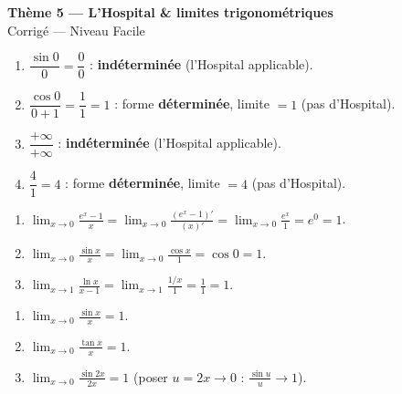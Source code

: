 \documentclass[11pt,a4paper]{article}
\begin{document}
\begin{center}
{\Large\bfseries\color{primarydark}Thème 5 — L'Hospital \& limites trigonométriques}\\[2pt]
{\large\color{excol}Corrigé — Niveau Facile}
\end{center}
\vspace{6pt}

\begin{correction}
\begin{enumerate}[label=\alph*),leftmargin=2em,itemsep=3pt]
  \item $\dfrac{\sin 0}{0}=\dfrac00$ : \textbf{indéterminée} (l'Hospital applicable).
  \item $\dfrac{\cos 0}{0+1}=\dfrac{1}{1}=1$ : forme \textbf{déterminée}, limite $=1$ (pas d'Hospital).
  \item $\dfrac{+\infty}{+\infty}$ : \textbf{indéterminée} (l'Hospital applicable).
  \item $\dfrac{4}{1}=4$ : forme \textbf{déterminée}, limite $=4$ (pas d'Hospital).
\end{enumerate}
\end{correction}

\begin{correction}
\begin{enumerate}[label=\alph*),leftmargin=2em,itemsep=3pt]
  \item $\displaystyle\lim_{x\to 0}\frac{e^x-1}{x}=\lim_{x\to 0}\frac{(e^x-1)'}{(x)'}=\lim_{x\to0}\frac{e^x}{1}=e^0=1$.
  \item $\displaystyle\lim_{x\to 0}\frac{\sin x}{x}=\lim_{x\to 0}\frac{\cos x}{1}=\cos 0=1$.
  \item $\displaystyle\lim_{x\to 1}\frac{\ln x}{x-1}=\lim_{x\to 1}\frac{1/x}{1}=\frac{1}{1}=1$.
\end{enumerate}
\end{correction}

\begin{correction}
\begin{enumerate}[label=\alph*),leftmargin=2em,itemsep=3pt]
  \item $\displaystyle\lim_{x\to 0}\frac{\sin x}{x}=1$.
  \item $\displaystyle\lim_{x\to 0}\frac{\tan x}{x}=1$.
  \item $\displaystyle\lim_{x\to 0}\frac{\sin 2x}{2x}=1$ (poser $u=2x\to 0$ : $\frac{\sin u}{u}\to 1$).
\end{enumerate}
\end{correction}
\end{document}
